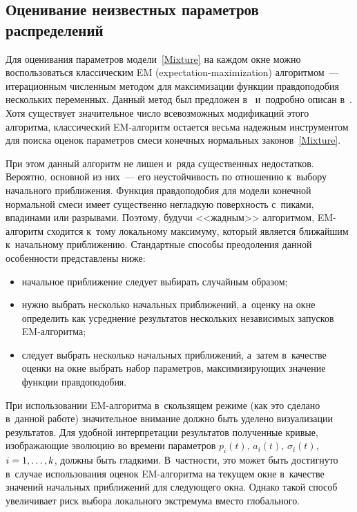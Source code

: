 \begin{multicols}{2}
\section{Оценивание неизвестных параметров распределений}

Для оценивания параметров модели~\eqref{Mixture} на каж\-дом окне
можно воспользоваться классическим EM (expectation-maximization) ал\-го\-рит\-мом~---
итерационным численным методом для максимизации функции
правдоподобия нескольких переменных. Данный метод был
предложен в~\cite{Dempster1977} и~подробно описан
в~\cite{Korolev2011}. Хотя существует значительное чис\-ло
всевозможных модификаций этого алгоритма, классический
EM-ал\-го\-ритм остается весьма надежным инструментом для поиска
оценок параметров смеси конечных нормальных
законов~\eqref{Mixture}.

При этом данный алгоритм не лишен и~ряда существенных недостатков.
Вероятно, основной из них~--- его неустойчивость по отношению 
к~выбору начального приближения. Функция правдоподобия для модели
конечной нормальной смеси  имеет существенно негладкую поверхность 
с~пиками, впадинами или разрывами. Поэтому, будучи <<жадным>>
алгоритмом, EM-ал\-го\-ритм сходится к~тому локальному максимуму,
который является ближайшим к~начальному приближению. Стандартные
способы преодоления данной особенности представлены ниже:
\begin{itemize}
\item начальное приближение следует выбирать случайным образом;
\item нужно выбрать несколько начальных приближений, а~оценку на
окне определить как усреднение результатов нескольких независимых
запусков EM-ал\-го\-ритма;
\item  следует выбрать несколько начальных приближений, а~затем 
в~качестве оценки на окне выбрать набор параметров,
максимизирующих значение функции правдоподобия.
\end{itemize}

При использовании EM-алгоритма в~скользящем режиме (как это
сделано в~данной работе) значительное внимание должно быть
уделено визуализации результа\-тов. Для удобной интерпретации
результа\-тов полученные кривые, изобража\-ющие эволюцию во
времени параметров $p_i(t)$, $a_i(t)$, $\sigma_i(t)$, $i\hm=1,\ldots,k$,
должны быть гладкими. В~частности, это может быть достигнуто 
в~случае использования оценок EM-ал\-го\-рит\-ма на текущем окне 
в~качестве значений начальных приближений для следующего окна.
Однако такой способ увеличивает риск выбора локального
экстремума вместо глобального.


\end{multicols}
